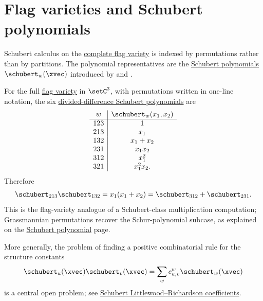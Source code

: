 \section[schubertCalculusFlagVariety]{Flag varieties and Schubert polynomials}

Schubert calculus on the \hyperref[flagVarieties]{complete flag
variety} is indexed by permutations
rather than by partitions.  The polynomial representatives are the
\hyperref[schubert]{Schubert polynomials} $\schubert_w(\xvec)$ introduced by
 and 
\cite{LascouxSchutzenberger1982}.

For the full \hyperref[flagVarieties]{flag variety} in $\setC^3$, with
permutations written in one-line notation, the six
\hyperref[schubertOperatorformula]{divided-difference Schubert polynomials}
are
\[
\begin{array}{c|c}
w & \schubert_w(x_1,x_2)\\
\hline
123 & 1\\
213 & x_1\\
132 & x_1+x_2\\
231 & x_1x_2\\
312 & x_1^2\\
321 & x_1^2x_2.
\end{array}
\]
Therefore
\[
  \schubert_{213}\schubert_{132}
  =
  x_1(x_1+x_2)
  =
  \schubert_{312}+\schubert_{231}.
\]
This is the flag-variety analogue of a Schubert-class multiplication
computation; Grassmannian permutations recover the Schur-polynomial subcase,
as explained on the \hyperref[grassmannianPermutation]{Schubert polynomial}
page.

More generally, the problem of finding a positive combinatorial rule for the
structure constants
\[
  \schubert_u(\xvec)\schubert_v(\xvec)
  =
  \sum_w c_{u,v}^w\schubert_w(\xvec)
\]
is a central open problem; see
\hyperref[schubertLittlewoodRichardson]{Schubert Littlewood--Richardson
coefficients}.

